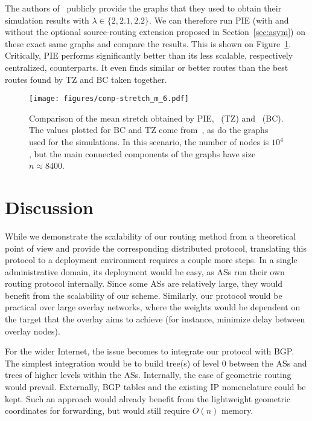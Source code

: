 \documentclass[conference]{IEEEtran}
\begin{document}
The authors of~\cite{brady} publicly provide the graphs that they used to obtain their simulation results with $\lambda  \in \{2,2.1,2.2\}$.
We can therefore run PIE (with and without the optional source-routing extension proposed in Section~\ref{sec:asym}) on these exact same graphs and compare the results. This is shown on Figure~\ref{fig:comp}. Critically, PIE performs significantly better than its less scalable, respectively centralized, counterparts. It even finds similar or better routes than the best routes found by TZ and BC taken together.

\begin{figure}
\centering
\texttt{[image: figures/comp-stretch\_m\_6.pdf]}\vspace{-1em}
\caption{Comparison of the mean stretch obtained by PIE,~\cite{thorup:compact} (TZ) and~\cite{brady} (BC).
The values plotted for BC and TZ come from~\cite{brady}, as do the graphs used for the simulations. In this scenario, the number of nodes is $10^4$, but the main connected components of the graphs have size $n \approx 8400$.}
\vspace{-1.2em}
\label{fig:comp}
\end{figure}

\section{Discussion}
\label{sec:discussion}
While we demonstrate the scalability of our routing method from a
theoretical point of view and provide the corresponding distributed protocol,
translating this protocol to a deployment environment requires a couple
more steps.
In a single administrative domain, its deployment would be
easy, as ASs run their own routing protocol internally. Since some ASs
are relatively large, they would benefit from the scalability of our
scheme.
Similarly, our protocol would be practical over large overlay
networks, where the weights would be dependent on the target that the
overlay aims to achieve (for instance, minimize delay between overlay nodes).

For the wider Internet, the issue becomes to integrate our protocol
with BGP.
The simplest integration would be to build tree(s) of level $0$ between the ASs and trees of higher levels within the ASs. Internally, the ease of geometric routing would prevail. Externally, BGP tables and the existing IP nomenclature could be kept. Such an approach would already benefit from the lightweight geometric coordinates for forwarding, but would still require $O(n)$ memory.
\end{document}
